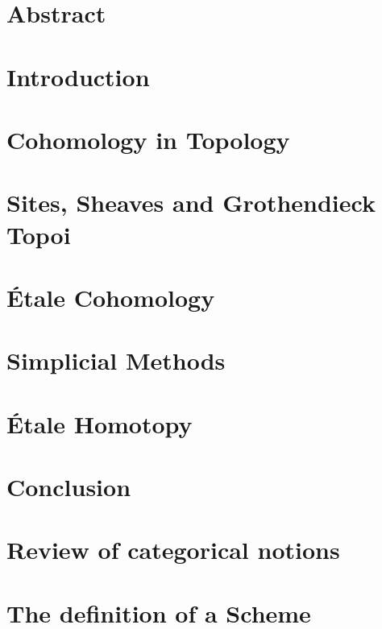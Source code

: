 \documentclass[11pt, openany]{memoir}
\theoremstyle{definition}
\begin{document}
  \nocite{*}

  \chapter*{Abstract}
  
  
  \tableofcontents

  \chapter{Introduction}
  

  \chapter{Cohomology in Topology}
  

  \chapter{Sites, Sheaves and Grothendieck Topoi}
  

  \chapter{\'Etale Cohomology}
  

  \chapter{Simplicial Methods}
  

  \chapter{\'Etale Homotopy}

  \chapter{Conclusion}
  

  \appendix
  \chapter{Review of categorical notions}
  
  \chapter{The definition of a Scheme}
  

  
  
\end{document}
